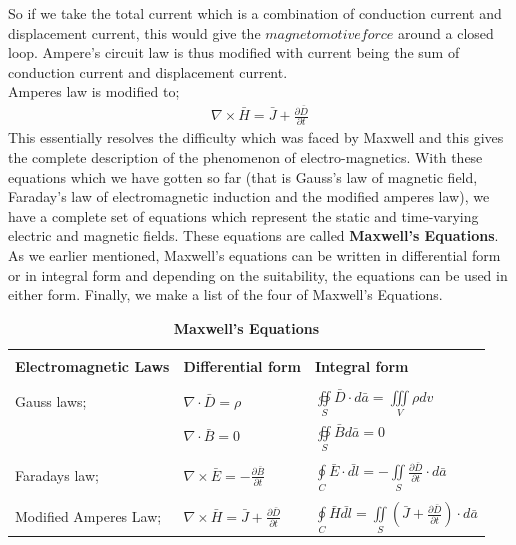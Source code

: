 So if we take the total current which is a combination of conduction current and displacement current, this would give the $magnetomotive force$ around a closed loop.
Ampere's circuit law is thus modified with current being the sum of conduction current and displacement current.\\
Amperes law is modified to;
\begin{align}
	\nabla\times\bar{H}=\bar{J}+\frac{\partial\bar{D}}{\partial t}
\end{align}
This essentially resolves the difficulty which was faced by Maxwell and this gives the complete description of the phenomenon of electro-magnetics. With these equations which we have gotten so far (that is Gauss's law of magnetic field, Faraday's law of electromagnetic induction and the modified amperes law), we have a complete set of equations which represent the static and time-varying electric and magnetic fields. These equations are called \textbf{Maxwell's Equations}. As we earlier mentioned, Maxwell's equations can be written in differential form or in integral form and depending on the suitability, the equations can be used in either form. Finally, we make a list of the four of Maxwell's Equations.
\begin{table}[h]
	\caption{\textbf{Maxwell's Equations}}
	\centering
	\begin{tabular}{p{3cm} p{2cm} p{2cm}}
			\hline \\
			\textbf{Electromagnetic Laws} & \textbf{Differential form} & \textbf{Integral form} \\ [0.5ex]
			\hline \\
			Gauss laws; & $\nabla\cdot\bar{D}=\rho$ & $\oiint\limits_S\bar{D}\cdot d\bar{a}=\iiint\limits_V
			\rho dv$\\
			& $\nabla\cdot\bar{B}=0$ & $\oiint\limits_S\bar{B}d\bar{a}=0$\\
			\hline \\
			
			Faradays law; & $\nabla\times\bar{E}=-\frac{\partial\bar{B}}{\partial t}$ & $\oint\limits_C\bar{E}\cdot\bar{dl}=-\iint\limits_S\frac{\partial\bar{D}}{\partial t}\cdot d\bar{a}$ \\
			\hline \\
			Modified Amperes Law; &
			$\nabla\times\bar{H}=\bar{J}+\frac{\partial\bar{D}}{\partial t}$ & $\oint\limits_C\bar{H}\bar{dl}=\iint\limits_S(\bar{J}+\frac{\partial\bar{D}}{\partial t})\cdot d\bar{a}$ \\
			\hline
		\end{tabular}
\end{table}

